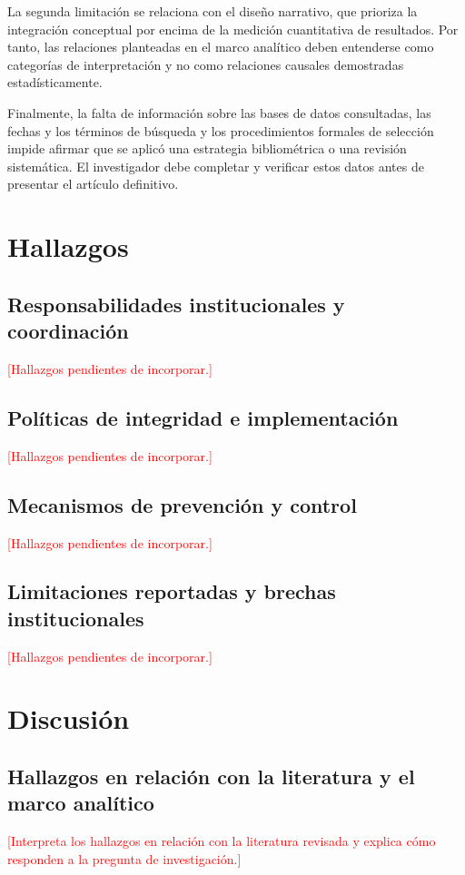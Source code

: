 \documentclass[Afour,sageh,times]{sagej}
\newcommand{\relleno}[1]{\textcolor{red}{[#1]}}
\begin{document}
La segunda limitación se relaciona con el diseño narrativo, que prioriza la integración conceptual por encima de la medición cuantitativa de resultados. Por tanto, las relaciones planteadas en el marco analítico deben entenderse como categorías de interpretación y no como relaciones causales demostradas estadísticamente.

Finalmente, la falta de información sobre las bases de datos consultadas, las fechas y los términos de búsqueda y los procedimientos formales de selección impide afirmar que se aplicó una estrategia bibliométrica o una revisión sistemática. El investigador debe completar y verificar estos datos antes de presentar el artículo definitivo.

\section{Hallazgos}
\subsection{Responsabilidades institucionales y coordinación}
\relleno{Hallazgos pendientes de incorporar.}

\subsection{Políticas de integridad e implementación}
\relleno{Hallazgos pendientes de incorporar.}

\subsection{Mecanismos de prevención y control}
\relleno{Hallazgos pendientes de incorporar.}

\subsection{Limitaciones reportadas y brechas institucionales}
\relleno{Hallazgos pendientes de incorporar.}

\section{Discusión}
\subsection{Hallazgos en relación con la literatura y el marco analítico}
\relleno{Interpreta los hallazgos en relación con la literatura revisada y explica cómo responden a la pregunta de investigación.}
\end{document}
